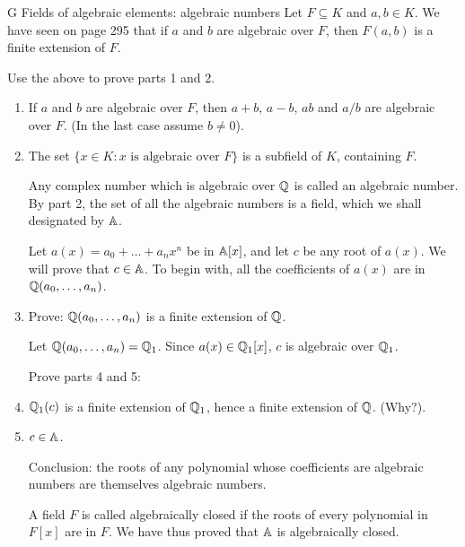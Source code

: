 \begin{exercise}{G Fields of algebraic elements: algebraic numbers}
Let $F\subseteq K$ and $a,b\in K$. We have seen on page 295 that if $a$ and $b$ are algebraic over $F$, then $F(a,b)$ is a finite extension of $F$.

Use the above to prove parts 1 and 2.
\begin{enumerate}
    \item If $a$ and $b$ are algebraic over $F$, then $a+b,\, a-b,\, ab$ and $a/b$ are algebraic over $F$. (In the last case assume $b\neq 0$).
    \item The set $\{x\in K:x\text{ is algebraic over }F\}$ is a subfield of $K$, containing $F$.

    Any complex number which is algebraic over $\mathbb{Q}$ is called an algebraic number. By part 2, the set of all the algebraic numbers is a field, which we shall designated by $\mathbb{A}$.

    Let $a(x)=a_0+\dots+a_nx^n$ be in $\mathbb{A}[x]$, and let $c$ be any root of $a(x)$. We will prove that $c\in\mathbb{A}$. To begin with, all the coefficients of $a(x)$ are in $\mathbb{Q}(a_0,\dots,a_n)$.
    \item Prove: $\mathbb{Q}(a_0,\dots,a_n)$ is a finite extension of $\mathbb{Q}$.

    Let $\mathbb{Q}(a_0,\dots,a_n)=\mathbb{Q}_1$. Since $a(x)\in\mathbb{Q}_1[x]$, $c$ is algebraic over $\mathbb{Q}_1$.

    Prove parts 4 and 5:
    \item $\mathbb{Q}_1(c)$ is a finite extension of $\mathbb{Q}_1$, hence a finite extension of $\mathbb{Q}$. (Why?).
    \item $c\in\mathbb{A}$.

    Conclusion: the roots of any polynomial whose coefficients are algebraic numbers are themselves algebraic numbers.

    A field $F$ is called algebraically closed if the roots of every polynomial in $F[x]$ are in $F$. We have thus proved that $\mathbb{A}$ is algebraically closed.
\end{enumerate}
\end{exercise}
